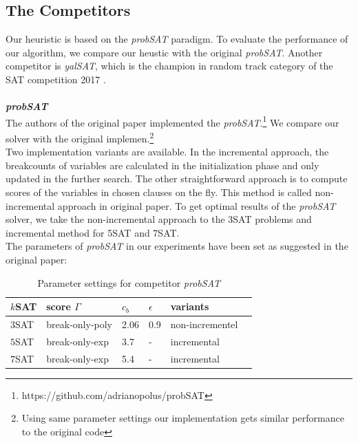 \documentclass[12pt,a4paper,twoside]{scrartcl}
\numberwithin{equation}{section}
\begin{document}
\subsection{The Competitors}
\label{comparision}
Our heuristic is based on the \emph{probSAT} paradigm. To evaluate the performance of our algorithm, we compare our heustic with the original \emph{probSAT}. Another competitor is \emph{yalSAT}, which is the champion in random track category of the SAT competition 2017 \cite{biere2014yet}.\\
\\
\emph{\textbf{probSAT}} 
\\
The authors of the original paper implemented the \emph{probSAT}.\footnote{https://github.com/adrianopolus/probSAT} We compare our solver with the original implemen.\footnote{Using same parameter settings our implementation gets similar performance to the original code}  \\
Two implementation variants are available. In the incremental approach, the breakcounts of variables are calculated in the initialization phase and only updated in the further search. The other straightforward approach is to compute scores of the variables in chosen clauses on the fly. This method is called non-incremental approach in original paper. To get optimal results of the \emph{probSAT} solver, we take the non-incremental approach to the 3SAT problems and incremental method for 5SAT and 7SAT.\\
The parameters of \emph{probSAT} in our experiments have been set as suggested in the original paper:\\
\begin{table}[h!]
\begin{center}
    \begin{tabular}{| l | l| l | l| l |p{3cm}|}
\hline 
    $k$SAT & score $\Gamma$ & $c_b$ & $\epsilon$ &variants \\ \hline
    $3$SAT & break-only-poly& 2.06 & 0.9 &non-incrementel \\ \hline
    $5$SAT & break-only-exp & 3.7 & - & incremental \\ \hline
    $7$SAT &  break-only-exp & 5.4 & - & incremental \\ \hline
\end{tabular}
\caption[probSAT]{Parameter settings for competitor \emph{probSAT}}
\end{center}
\end{table} 
\end{document}
